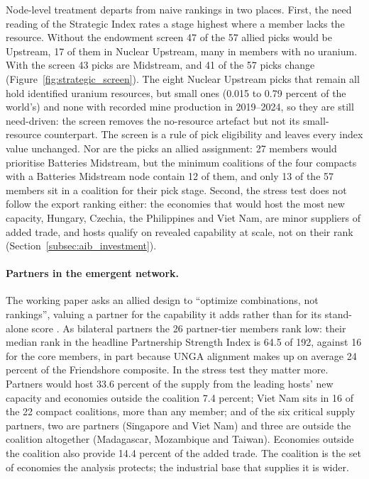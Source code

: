 Node-level treatment departs from naive rankings in two places. First, the need reading of the
Strategic Index rates a stage highest where a member lacks the resource. Without the endowment
screen 47 of the 57 allied picks would be Upstream, 17 of them in Nuclear Upstream, many in members
with no uranium. With the screen 43 picks are Midstream, and 41 of the 57 picks change (Figure~\ref{fig:strategic_screen}). The
eight Nuclear Upstream picks that remain all hold identified uranium resources, but small ones
(0.015 to 0.79 percent of the world's) and none with recorded mine production in 2019--2024, so
they are still need-driven: the screen removes the no-resource artefact but not its small-resource
counterpart. The screen is a rule of pick eligibility and leaves every index value unchanged. Nor
are the picks an allied assignment: 27 members would prioritise Batteries Midstream, but the minimum
coalitions of the four compacts with a Batteries Midstream node contain 12 of them, and only 13 of the
57 members sit in a coalition for their pick stage. Second, the stress test does not follow the export
ranking either: the economies that would host the most new capacity, Hungary, Czechia, the Philippines
and Viet Nam, are minor suppliers of added trade, and hosts qualify on revealed capability at scale,
not on their rank (Section~\ref{subsec:aib_investment}).

\paragraph{Partners in the emergent network.} The working paper asks
an allied design to ``optimize combinations, not rankings'', valuing a partner for the capability
it adds rather than for its stand-alone score \citep{neis2026allied}. As bilateral partners the 26
partner-tier members rank low: their median rank in the headline Partnership Strength Index is 64.5
of 192, against 16 for the core members, in part because UNGA alignment makes up on average 24
percent of the Friendshore composite. In the stress test they matter more. Partners would host 33.6
percent of the supply from the leading hosts' new capacity and economies outside the coalition 7.4
percent; Viet Nam sits in 16 of the 22 compact coalitions, more than any member; and of the six
critical supply partners, two are partners (Singapore and Viet Nam) and three are outside the
coalition altogether (Madagascar, Mozambique and Taiwan). Economies outside the coalition also provide
14.4 percent of the added trade. The coalition is the set of economies the analysis protects; the
industrial base that supplies it is wider.

